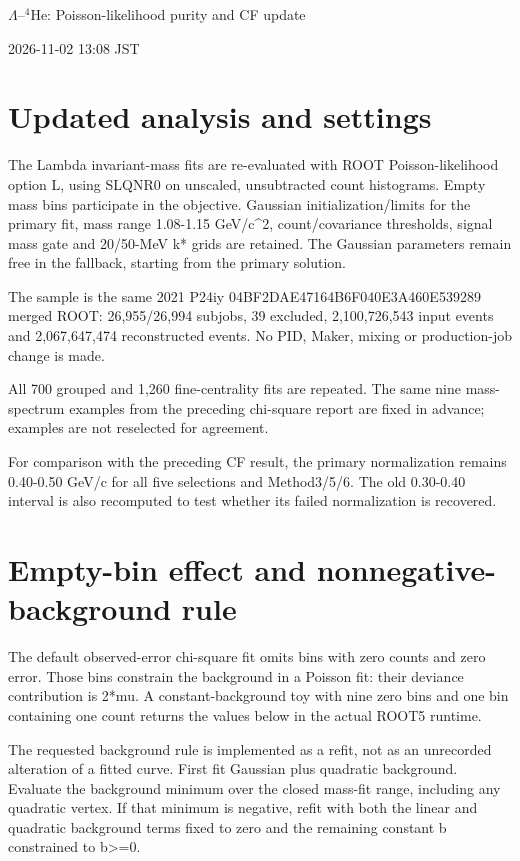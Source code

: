 \documentclass[10pt,a4paper]{article}
\begin{document}
\begin{center}{\Large $\Lambda$--$^{4}$He: Poisson-likelihood purity and CF update}\end{center}
2026-11-02 13:08 JST

\section*{Updated analysis and settings}
The Lambda invariant-mass fits are re-evaluated with ROOT Poisson-likelihood option L, using SLQNR0 on unscaled, unsubtracted count histograms. Empty mass bins participate in the objective. Gaussian initialization/limits for the primary fit, mass range 1.08-1.15 GeV/c\textasciicircum{}2, count/covariance thresholds, signal mass gate and 20/50-MeV k* grids are retained. The Gaussian parameters remain free in the fallback, starting from the primary solution.

The sample is the same 2021 P24iy 04BF2DAE47164B6F040E3A460E539289 merged ROOT: 26,955/26,994 subjobs, 39 excluded, 2,100,726,543 input events and 2,067,647,474 reconstructed events. No PID, Maker, mixing or production-job change is made.

All 700 grouped and 1,260 fine-centrality fits are repeated. The same nine mass-spectrum examples from the preceding chi-square report are fixed in advance; examples are not reselected for agreement.

For comparison with the preceding CF result, the primary normalization remains 0.40-0.50 GeV/c for all five selections and Method3/5/6. The old 0.30-0.40 interval is also recomputed to test whether its failed normalization is recovered.

\clearpage
\section*{Empty-bin effect and nonnegative-background rule}
The default observed-error chi-square fit omits bins with zero counts and zero error. Those bins constrain the background in a Poisson fit: their deviance contribution is 2*mu. A constant-background toy with nine zero bins and one bin containing one count returns the values below in the actual ROOT5 runtime.

The requested background rule is implemented as a refit, not as an unrecorded alteration of a fitted curve. First fit Gaussian plus quadratic background. Evaluate the background minimum over the closed mass-fit range, including any quadratic vertex. If that minimum is negative, refit with both the linear and quadratic background terms fixed to zero and the remaining constant b constrained to b>=0.
\end{document}
